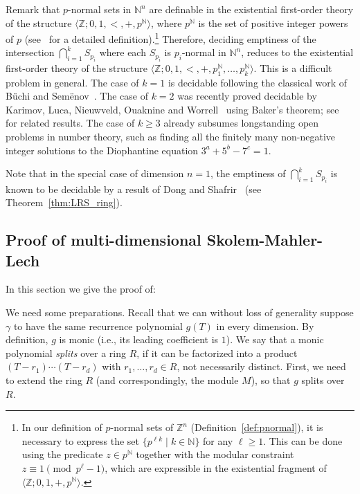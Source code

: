 \documentclass[letterpaper, 11pt, thm-restate]{article}
\numberwithin{equation}{section}
\newcommand{\Z}{\mathbb{Z}}
\newcommand{\N}{\mathbb{N}}
\newcommand{\gen}[1]{\langle {#1} \rangle}
\theoremstyle{definition}
\theoremstyle{definition}
\theoremstyle{definition}
\begin{document}
Remark that $p$-normal sets in $\N^n$ are definable in the existential first-order theory of the structure $\gen{\Z; 0, 1, <, +, p^{\N}}$, where $p^{\N}$ is the set of positive integer powers of $p$ (see~\cite{karimov2025decidability} for a detailed definition).\footnote{In our definition of $p$-normal sets of $\Z^n$ (Definition~\ref{def:pnormal}), it is necessary to express the set $\{p^{\ell k} \mid k \in \N\}$ for any $\ell \geq 1$. This can be done using the predicate $z \in p^{\N}$ together with the modular constraint $z \equiv 1 \pmod{p^{\ell} - 1}$, which are expressible in the existential fragment of $\gen{\Z; 0, 1, +, p^{\N}}$.}
Therefore, deciding emptiness of the intersection $\bigcap_{i = 1}^k S_{p_i}$ where each $S_{p_i}$ is $p_i$-normal in $\N^n$, reduces to the existential first-order theory of the structure $\gen{\Z; 0, 1, <, +, p_1^{\N}, \ldots, p_k^{\N}}$.
This is a difficult problem in general.
The case of $k = 1$ is decidable following the classical work of B\"{u}chi and Sem\"{e}nov~\cite{buchi1960weak, semenov1980certain}.
The case of $k=2$ was recently proved decidable by Karimov, Luca, Nieuwveld, Ouaknine and Worrell~\cite{karimov2025decidability} using Baker's theorem; see~\cite{bajpai2023effective, hieronymi2022strong, HieronymiReitmeirWang2026} for related results.
The case of $k \geq 3$ already subsumes longstanding open problems in number theory, such as finding all the finitely many non-negative integer solutions to the Diophantine equation $3^a + 5^b - 7^c = 1$.

Note that in the special case of dimension $n = 1$, the emptiness of $\bigcap_{i = 1}^k S_{p_i}$ is known to be decidable by a result of Dong and Shafrir~\cite{dong2025skolemproblemringspositive} (see Theorem~\ref{thm:LRS_ring}).

\subsection{Proof of multi-dimensional Skolem-Mahler-Lech}

In this section we give the proof of:
\thmLRS*

We need some preparations.
Recall that we can without loss of generality suppose $\gamma$ to have the same recurrence polynomial $g(T)$ in every dimension.
By definition, $g$ is monic (i.e., its leading coefficient is $1$).
We say that a monic polynomial \emph{splits} over a ring $R$, if it can be factorized into a product $(T-r_1) \cdots (T - r_d)$ with $r_1, \ldots, r_d \in R$, not necessarily distinct.
First, we need to extend the ring $R$ (and correspondingly, the module $M$), so that $g$ splits over $R$.
\end{document}
